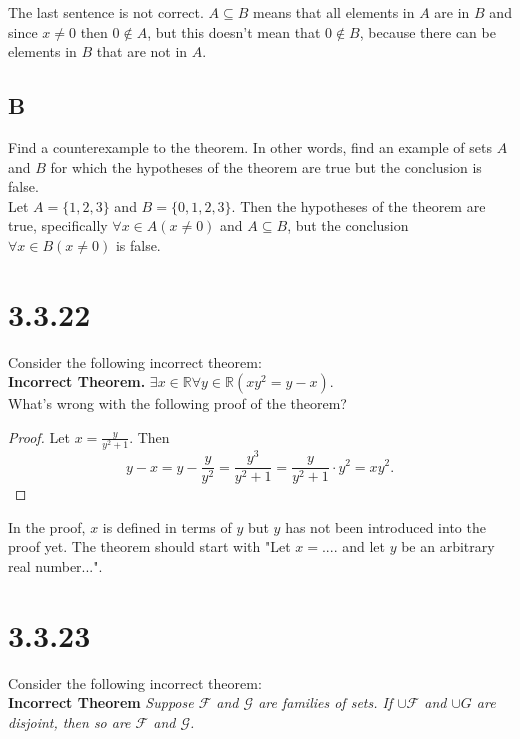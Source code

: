 \documentclass{article}
\newcommand{\n}{ \noindent }
\newcommand{\F}{\mathcal{F}}
\newcommand{\G}{\mathcal{G}}
\begin{document}
\n The last sentence is not correct. $A \subseteq B$ means that all elements in $A$ are in $B$ and since $x \neq 0$ then $0 \notin A$, but this doesn't mean that $0 \notin B$, because there can be elements in $B$ that are not in $A$.

\subsection*{B}
Find a counterexample to the theorem. In other words, find an example
of sets $A$ and $B$ for which the hypotheses of the theorem are
true but the conclusion is false. \\

\n Let $A = \{1,2,3\}$ and $B = \{0,1,2,3\}$. Then the hypotheses of the theorem are true, specifically $\forall x \in A (x \neq 0)$ and $A \subseteq B$, but the conclusion $\forall x \in B (x \neq 0)$ is false.

\section*{3.3.22}
Consider the following incorrect theorem: \\

\n \textbf{Incorrect Theorem.} $\exists x \in \mathbb{R} \forall y \in \mathbb{R} (xy^2 = y - x)$. \\

\n What's wrong with the following proof of the theorem? \\

\begin{proof}
Let $x = \tfrac{y}{y^2+1}$. Then \\
\begin{equation*}
y - x = y - \frac{y}{y^2} = \frac{y^3}{y^2 + 1} = \frac{y}{y^2 + 1} \cdot y^2 = xy^2.
\end{equation*}
\end{proof}

\n In the proof, $x$ is defined in terms of $y$ but $y$ has not been introduced into the proof yet. The theorem should start with "Let $x = ...$. and let $y$ be an arbitrary real number...".

\section*{3.3.23}
\n Consider the following incorrect theorem: \\

\n \textbf{Incorrect Theorem} \textit{Suppose $\F$ and $\G$ are families of sets. If $\cup \F$ and $\cup G$ are disjoint, then so are $\F$ and $\G$.} \\
\end{document}
